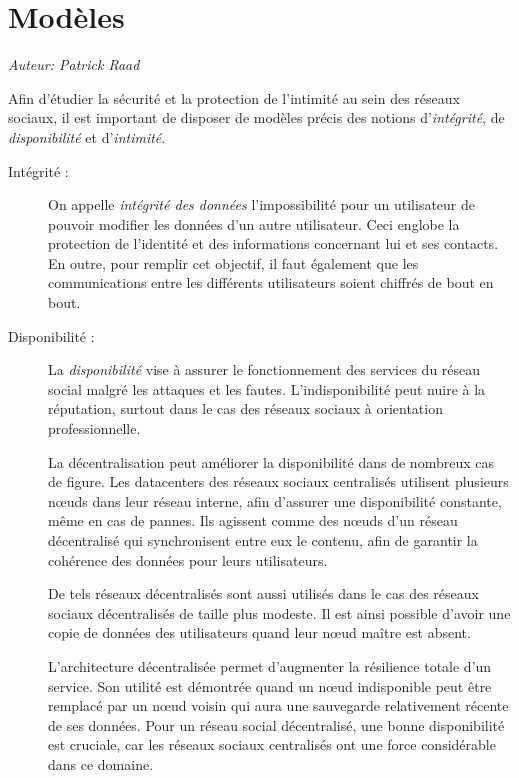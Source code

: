 \section{Modèles}

\begin{flushright}\textit{Auteur: Patrick Raad}\end{flushright}

Afin d'étudier la sécurité et la protection de l'intimité au sein des réseaux
sociaux, il est important de disposer de modèles précis des notions
d'\textit{intégrité}, de \textit{disponibilité} et d'\textit{intimité}.

\begin{description}

\item[Intégrité :] On appelle \textit{intégrité des données} l'impossibilité
pour un utilisateur de pouvoir modifier les données d'un autre
utilisateur. \cite{safebook}  Ceci englobe la protection de l'identité et des
informations concernant lui et ses contacts.  En outre, pour remplir cet
objectif, il faut également que les communications entre les différents
utilisateurs soient chiffrés de bout en bout.

\item[Disponibilité :] La \textit{disponibilité} vise à assurer le
fonctionnement des services du réseau social malgré les attaques et les fautes.
L'indisponibilité peut nuire à la réputation, surtout dans le cas des réseaux
sociaux à orientation professionnelle.

La décentralisation peut améliorer la disponibilité dans de nombreux cas de
figure. Les datacenters des réseaux sociaux centralisés utilisent plusieurs
nœuds dans leur réseau interne, afin d'assurer une disponibilité constante, même
en cas de pannes. Ils agissent comme des nœuds d'un réseau décentralisé qui
synchronisent entre eux le contenu, afin de garantir la cohérence des données
pour leurs utilisateurs.

De tels réseaux décentralisés sont aussi utilisés dans le cas des réseaux
sociaux décentralisés de taille plus modeste. Il est ainsi possible d'avoir
une copie de données des utilisateurs quand leur nœud maître est absent.

L'architecture décentralisée permet d'augmenter la résilience totale d'un
service. Son utilité est démontrée quand un nœud indisponible peut être
remplacé par un nœud voisin qui aura une sauvegarde relativement récente de ses
données. Pour un réseau social décentralisé, une bonne disponibilité est
cruciale, car les réseaux sociaux centralisés ont une force considérable dans
ce domaine. \cite{facebook-uptime}


\end{description}
